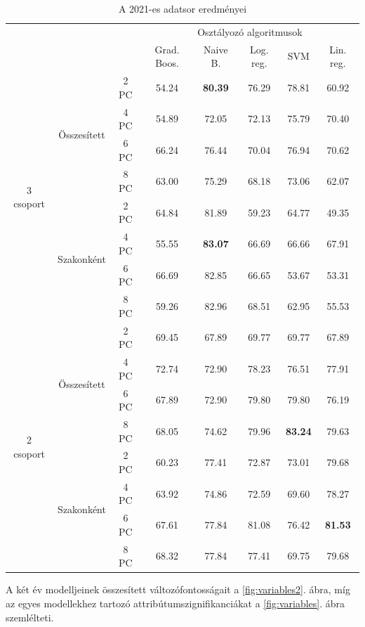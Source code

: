 \documentclass[12pt]{article}
\begin{document}
\begin{table}[H]
\centering
\begin{tabular}{ccc|ccccc}

    &&&\multicolumn{5}{c}{Osztályozó algoritmusok} \\
    &&& Grad. Boos. &  Naive B. & Log. reg.  &  SVM & Lin. reg. \\ 
        \hline
    \multirow{8}{*}{3 csoport}& \multirow{4}{*}{Összesített}&2 PC&54.24&\textbf{80.39}&76.29&78.81&60.92 \\
    												&&4 PC&54.89&72.05&72.13&75.79&70.40\\
    												&&6 PC&66.24&76.44&70.04&76.94&70.62\\
    												&&8 PC&63.00&75.29&68.18&73.06&62.07\\\cline{3-8}%
    						 & \multirow{4}{*}{Szakonként}&2 PC&64.84&81.89&59.23&64.77&49.35\\
    												&&4 PC&55.55&\textbf{83.07}&66.69&66.66&67.91\\
    												&&6 PC&66.69&82.85&66.65&53.67&53.31\\
    												&&8 PC&59.26&82.96&68.51&62.95&55.53\\
    \hline
    \hline
    \multirow{8}{*}{2 csoport}& \multirow{4}{*}{Összesített}&2 PC&69.45&67.89&69.77&69.77&67.89 \\
    												&&4 PC&72.74&72.90&78.23&76.51&77.91\\
    												&&6 PC&67.89&72.90&79.80&79.80&76.19\\
    												&&8 PC&68.05&74.62&79.96&\textbf{83.24}&79.63\\\cline{3-8}
    						 & \multirow{4}{*}{Szakonként}&2 PC&60.23&77.41&72.87&73.01&79.68\\
    												&&4 PC&63.92&74.86&72.59&69.60&78.27\\
    												&&6 PC&67.61&77.84&81.08&76.42&\textbf{81.53}\\
    												&&8 PC&68.32&77.84&77.41&69.75&79.68\\
    												\hline
\end{tabular}
\caption{A 2021-es adatsor eredményei}
\label{tab:multicol2}
\end{table}


A két év modelljeinek összesített változófontosságait a \ref{fig:variables2}. ábra, míg az egyes modellekhez tartozó attribútumszignifikanciákat a \ref{fig:variables}. ábra szemlélteti.
\end{document}
